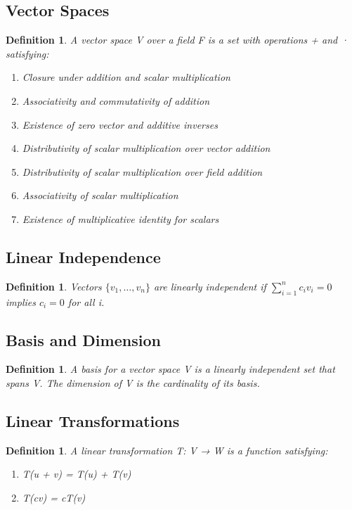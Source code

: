 \documentclass[10pt,a4paper,twocolumn]{article}
\newtheorem{definition}[theorem]{Definition}
\begin{document}
\subsection{Vector Spaces}
\begin{definition}
A vector space V over a field F is a set with operations + and · satisfying:
\begin{enumerate}[leftmargin=*]
\item Closure under addition and scalar multiplication
\item Associativity and commutativity of addition
\item Existence of zero vector and additive inverses
\item Distributivity of scalar multiplication over vector addition
\item Distributivity of scalar multiplication over field addition
\item Associativity of scalar multiplication
\item Existence of multiplicative identity for scalars
\end{enumerate}
\end{definition}

\subsection{Linear Independence}
\begin{definition}
Vectors $\{v_1, \ldots, v_n\}$ are linearly independent if $\sum_{i=1}^n c_i v_i = 0$ implies $c_i = 0$ for all i.
\end{definition}

\subsection{Basis and Dimension}
\begin{definition}
A basis for a vector space V is a linearly independent set that spans V. The dimension of V is the cardinality of its basis.
\end{definition}

\subsection{Linear Transformations}
\begin{definition}
A linear transformation T: V → W is a function satisfying:
\begin{enumerate}[leftmargin=*]
\item T(u + v) = T(u) + T(v)
\item T(cv) = cT(v)
\end{enumerate}
\end{definition}
\end{document}
